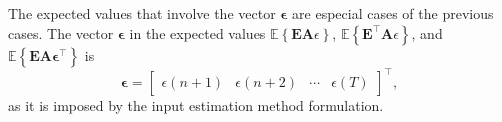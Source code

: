 \begin{pf}
The expected values that involve the vector $\bm{\epsilon}$ are especial cases of the previous cases. 
The vector $\bm{\epsilon}$ in the expected values $\mathbb{E} \left\{ \mathbf{E} \mathbf{A} \epsilon \right\}$, $\mathbb{E} \left\{ \mathbf{E}^\top \mathbf{A} \epsilon \right\}$, and $\mathbb{E} \left\{ \mathbf{E} \mathbf{A} \bm{\epsilon}^\top \right\}$ is
\begin{equation} \bm{\epsilon} = \begin{bmatrix} \epsilon(n+1) & \epsilon(n+2) & \cdots & \epsilon(T) \end{bmatrix}^\top, \end{equation}
as it is imposed by the input estimation method formulation.
\end{pf}




\newpage

